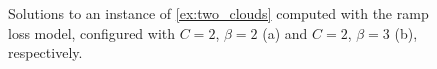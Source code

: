 \begin{example}
    \begin{figure}
        \centering
        \begin{subfigure}{.48\textwidth}
            \centering
            
            \caption{}
            \label{fig:two_clouds_solution_bad_2_a}
        \end{subfigure}
        \hfill
        \begin{subfigure}{.48\textwidth}
            \centering
            
            \caption{}
            \label{fig:two_clouds_solution_bad_2_b}
        \end{subfigure}
        \caption{Solutions to an instance of \autoref{ex:two_clouds} computed with the ramp loss model, configured with $C=2$, $\beta=2$ (a) and $C=2$, $\beta=3$ (b), respectively.}
        \label{fig:two_clouds_solution_bad_2}
    \end{figure}

\end{example}

